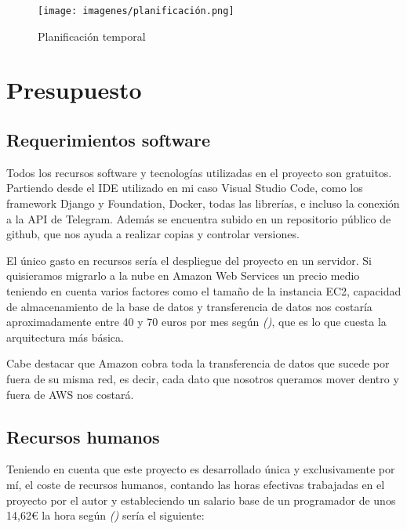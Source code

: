 \begin{figure}[!ht]
    \centering
    \texttt{[image: imagenes/planificación.png]}
    \caption{ Planificación temporal }
    \label{fig:planificacion}
\end{figure}
\vspace{1cm}

\section{Presupuesto}

\subsection{Requerimientos software}

Todos los recursos software y tecnologías utilizadas en el proyecto son gratuitos. Partiendo desde el IDE utilizado en mi caso Visual Studio Code, como los framework Django y Foundation, Docker, todas las librerías, e incluso la conexión a la API de Telegram. Además se encuentra subido en un repositorio público de github, que nos ayuda a realizar copias y controlar versiones. 

El único gasto en recursos sería el despliegue del proyecto en un servidor. Si quisieramos migrarlo a la nube en Amazon Web Services un precio medio teniendo en cuenta varios factores como el tamaño de la instancia EC2, capacidad de almacenamiento de la base de datos y transferencia de datos nos costaría aproximadamente entre 40 y 70 euros por mes según \textit{(\cite{aws2022})}, que es lo que cuesta la arquitectura más básica. 

Cabe destacar que Amazon cobra toda la transferencia de datos que sucede por fuera de su misma red, es decir, cada dato que nosotros queramos mover dentro y fuera de AWS nos costará.


\subsection{Recursos humanos}


Teniendo en cuenta que este proyecto es desarrollado única y exclusivamente por mí, el coste de recursos humanos, contando las horas efectivas trabajadas en el proyecto por el autor y estableciendo un salario base de un programador de unos 14,62€ la hora según  \textit{(\cite{salario2022})} sería el siguiente:\vspace{0.5cm}


